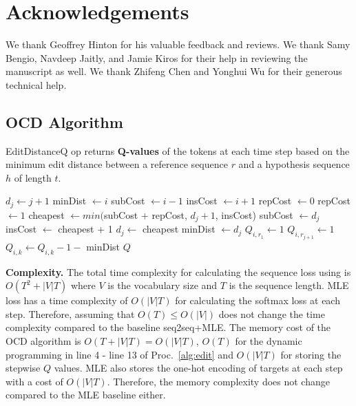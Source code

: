 \section*{Acknowledgements}
We thank Geoffrey Hinton for his valuable feedback and reviews. We thank Samy Bengio, Navdeep Jaitly,
and Jamie Kiros for their help in reviewing the manuscript as well. We thank Zhifeng Chen and
Yonghui Wu for their generous technical help.\fi
\fi

\begin{appendices}

\renewcommand\thefigure{\thesection.\arabic{figure}}
\renewcommand\thetable{\thesection.\arabic{table}}

\section{OCD Algorithm}
\label{sec:algorithm}
\begin{algorithm}[h!]
\caption[Caption of Alg]{EditDistanceQ op returns {\bf Q-values} of the tokens at each time step based on the minimum edit distance between a reference sequence $r$ and a hypothesis sequence $h$ of length $t$.
}\label{alg:edit}
\begin{algorithmic}[1]
\State $d_j \gets j + 1$
\EndFor
{}
\State minDist $\gets i$
\State subCost $\gets i - 1$
\State insCost $\gets i + 1$
\State repCost $\gets 0$
\Else
\State repCost $\gets 1$
\EndIf
\State cheapest $\gets min($subCost $+$ repCost, $d_{j} + 1$, insCost)
\State subCost $\gets d_j$
\State insCost $\gets$ cheapest + 1
\State $d_j \gets $ cheapest
\State minDist  $\gets d_j$
\EndIf
\EndFor
{}
\State $Q_{i, r_1} \gets 1$
\EndIf
{}
\State $Q_{i,r_{j+1}} \gets 1$
\EndIf
\EndFor
{}
\State $Q_{i,k} \gets Q_{i,k} - 1 - $ minDist
\EndFor
\EndFor
\Return $Q$
\end{algorithmic}
\end{algorithm}
{\bf Complexity.} The total time complexity for calculating the sequence loss using \acronym is $O(T^2 + |V|T)$ where $V$ is the vocabulary size and $T$ is the sequence length. MLE loss has a time complexity of $O(|V|T)$ for calculating the softmax loss at each step. Therefore, assuming that $O(T) \leq O(|V|)$ \acronym does not change the time complexity compared to the baseline seq2seq+MLE. The memory cost of the OCD algorithm is $O(T + |V|T) = O(|V|T)$, $O(T)$ for the dynamic programming in line 4 - line 13 of Proc.~\ref{alg:edit} and $O(|V|T)$ for storing the stepwise $Q$ values. MLE also stores the one-hot encoding of targets at each step with a cost of $O(|V|T)$. Therefore, the memory complexity does not change  compared to the MLE baseline either.


\end{appendices}
